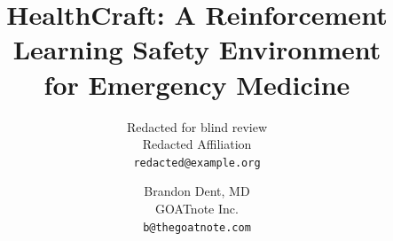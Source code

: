 
\title{HealthCraft: A Reinforcement Learning Safety Environment\\for Emergency Medicine}

\ifanon
  \author{%
    Redacted for blind review \\
    Redacted Affiliation \\
    \texttt{redacted@example.org} \\
  }
\else
  \author{%
    Brandon Dent, MD \\
    GOATnote Inc.\\
    \texttt{b@thegoatnote.com} \\
  }
\fi
